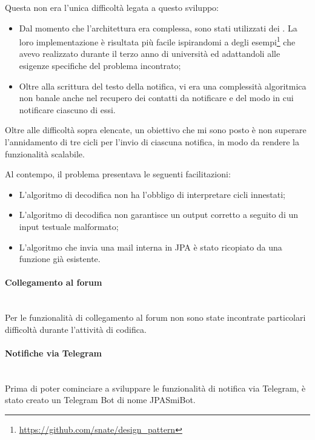 Questa non era l'unica difficoltà legata a questo sviluppo:

\begin{itemize}
\item Dal momento che l'architettura era complessa, sono stati utilizzati dei
  . La loro implementazione è risultata più facile
  ispirandomi a degli
  esempi\footnote{\url{https://github.com/snate/design_pattern}} che
  avevo realizzato durante il terzo anno di università ed adattandoli alle
  esigenze specifiche del problema incontrato;
\item Oltre alla scrittura del testo della notifica, vi era una complessità
  algoritmica non banale anche nel recupero dei contatti da notificare e del
  modo in cui notificare ciascuno di essi.
\end{itemize}

Oltre alle difficoltà sopra elencate, un obiettivo che mi sono posto è non
superare l'annidamento di tre cicli per l'invio di ciascuna notifica, in modo
da rendere la funzionalità scalabile.

Al contempo, il problema presentava le seguenti facilitazioni:

\begin{itemize}
\item L'algoritmo di decodifica non ha l'obbligo di interpretare cicli
  innestati;
\item L'algoritmo di decodifica non garantisce un output corretto a seguito di
  un input testuale malformato;
\item L'algoritmo che invia una mail interna in JPA è stato ricopiato da una
  funzione già esistente.
\end{itemize}

\paragraph{Collegamento al forum} \mbox{} \\

Per le funzionalità di collegamento al forum non sono state incontrate
particolari difficoltà durante l'attività di codifica.

\paragraph{Notifiche via Telegram} \mbox{} \\

Prima di poter cominciare a sviluppare le funzionalità di notifica via
Telegram, è stato creato un Telegram Bot di nome JPASmiBot.

